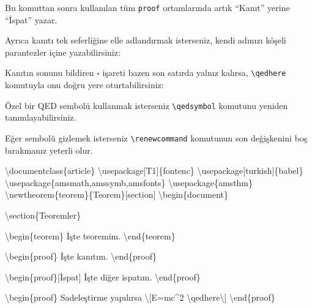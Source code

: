 \documentclass[
  letterpaper,
  DIV=11,
  numbers=noendperiod]{scrreprt}
\newenvironment{Shaded}{\begin{snugshade}}{\end{snugshade}}
\newcommand{\BuiltInTok}[1]{\textcolor[rgb]{0.00,0.23,0.31}{#1}}
\newcommand{\ExtensionTok}[1]{\textcolor[rgb]{0.00,0.23,0.31}{#1}}
\newcommand{\FunctionTok}[1]{\textcolor[rgb]{0.28,0.35,0.67}{#1}}
\newcommand{\KeywordTok}[1]{\textcolor[rgb]{0.00,0.23,0.31}{#1}}
\newcommand{\NormalTok}[1]{\textcolor[rgb]{0.00,0.23,0.31}{#1}}
\newcommand{\SpecialCharTok}[1]{\textcolor[rgb]{0.37,0.37,0.37}{#1}}
\newcommand{\SpecialStringTok}[1]{\textcolor[rgb]{0.13,0.47,0.30}{#1}}
\begin{document}
Bu komuttan sonra kullanılan tüm \texttt{proof} ortamlarında artık
``Kanıt'' yerine ``İspat'' yazar.

Ayrıca kanıtı tek seferliğine elle adlandırmak isterseniz, kendi adınızı
köşeli parantezler içine yazabilirsiniz:

Kanıtın sonunu bildiren \(\square\) işareti bazen son satırda yalnız
kalırsa, \texttt{\textbackslash{}qedhere} komutuyla onu doğru yere
oturtabilirsiniz:

Özel bir QED sembolü kullanmak isterseniz
\texttt{\textbackslash{}qedsymbol} komutunu yeniden tanımlayabilirsiniz.

Eğer sembolü gizlemek isterseniz \texttt{\textbackslash{}renewcommand}
komutunun son değişkenini boş bırakmanız yeterli olur.

\begin{Shaded}
\begin{Highlighting}[]
\BuiltInTok{\textbackslash{}documentclass}\NormalTok{\{}\ExtensionTok{article}\NormalTok{\}}
\BuiltInTok{\textbackslash{}usepackage}\NormalTok{[T1]\{}\ExtensionTok{fontenc}\NormalTok{\}}
\BuiltInTok{\textbackslash{}usepackage}\NormalTok{[turkish]\{}\ExtensionTok{babel}\NormalTok{\}}
\BuiltInTok{\textbackslash{}usepackage}\NormalTok{\{}\ExtensionTok{amsmath,amssymb,amsfonts}\NormalTok{\}}
\BuiltInTok{\textbackslash{}usepackage}\NormalTok{\{}\ExtensionTok{amsthm}\NormalTok{\}}
\FunctionTok{\textbackslash{}newtheorem}\NormalTok{\{teorem\}\{Teorem\}[section]}
\KeywordTok{\textbackslash{}begin}\NormalTok{\{}\ExtensionTok{document}\NormalTok{\}}

\KeywordTok{\textbackslash{}section}\NormalTok{\{Teoremler\}}

\KeywordTok{\textbackslash{}begin}\NormalTok{\{}\ExtensionTok{teorem}\NormalTok{\}}
\NormalTok{ İşte teoremim.}
\KeywordTok{\textbackslash{}end}\NormalTok{\{}\ExtensionTok{teorem}\NormalTok{\}}

\KeywordTok{\textbackslash{}begin}\NormalTok{\{}\ExtensionTok{proof}\NormalTok{\}}
\NormalTok{ İşte kanıtım.}
\KeywordTok{\textbackslash{}end}\NormalTok{\{}\ExtensionTok{proof}\NormalTok{\}}

\KeywordTok{\textbackslash{}begin}\NormalTok{\{}\ExtensionTok{proof}\NormalTok{\}[İspat]}
\NormalTok{ İşte diğer ispatım.}
\KeywordTok{\textbackslash{}end}\NormalTok{\{}\ExtensionTok{proof}\NormalTok{\}}

\KeywordTok{\textbackslash{}begin}\NormalTok{\{}\ExtensionTok{proof}\NormalTok{\}}
\NormalTok{ Sadeleştirme yapılırsa }\SpecialStringTok{\textbackslash{}[E=mc\^{}2 }\SpecialCharTok{\textbackslash{}qedhere}\SpecialStringTok{\textbackslash{}]}
\KeywordTok{\textbackslash{}end}\NormalTok{\{}\ExtensionTok{proof}\NormalTok{\}}


\end{Highlighting}
\end{Shaded}
\end{document}
